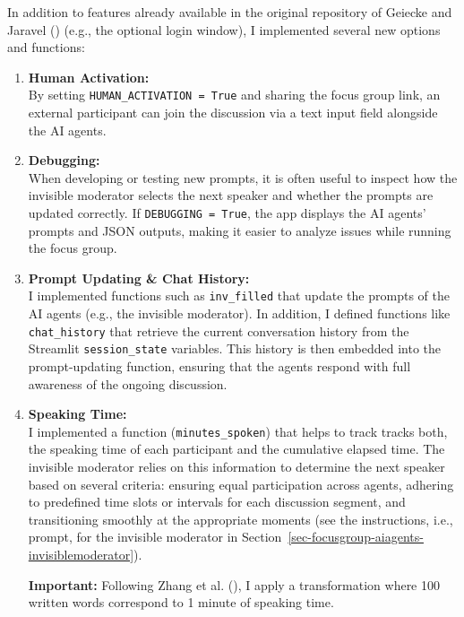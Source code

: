 \documentclass[
  letterpaper,
  DIV=11,
  numbers=noendperiod]{scrartcl}
\begin{document}
In addition to features already available in the original repository of
Geiecke and Jaravel () (e.g.,
the optional login window), I implemented several new options and
functions:

\begin{enumerate}
\def\labelenumi{\arabic{enumi}.}
\item
  \textbf{Human Activation:}\\
  By setting \texttt{HUMAN\_ACTIVATION\ =\ True} and sharing the focus
  group link, an external participant can join the discussion via a text
  input field alongside the AI agents.
\item
  \textbf{Debugging:}\\
  When developing or testing new prompts, it is often useful to inspect
  how the invisible moderator selects the next speaker and whether the
  prompts are updated correctly. If \texttt{DEBUGGING\ =\ True}, the app
  displays the AI agents' prompts and JSON outputs, making it easier to
  analyze issues while running the focus group.
\item
  \textbf{Prompt Updating \& Chat History:}\\
  I implemented functions such as \texttt{inv\_filled} that update the
  prompts of the AI agents (e.g., the invisible moderator). In addition,
  I defined functions like \texttt{chat\_history} that retrieve the
  current conversation history from the Streamlit
  \texttt{session\_state} variables. This history is then embedded into
  the prompt-updating function, ensuring that the agents respond with
  full awareness of the ongoing discussion.
\item
  \textbf{Speaking Time:}\\
  I implemented a function (\texttt{minutes\_spoken}) that helps to
  track tracks both, the speaking time of each participant and the
  cumulative elapsed time. The invisible moderator relies on this
  information to determine the next speaker based on several criteria:
  ensuring equal participation across agents, adhering to predefined
  time slots or intervals for each discussion segment, and transitioning
  smoothly at the appropriate moments (see the instructions, i.e.,
  prompt, for the invisible moderator in
  Section~\ref{sec-focusgroup-aiagents-invisiblemoderator}).

  \textbf{Important:} Following Zhang et al.
  (), I apply a
  transformation where 100 written words correspond to 1 minute of
  speaking time.
\end{enumerate}
\end{document}
